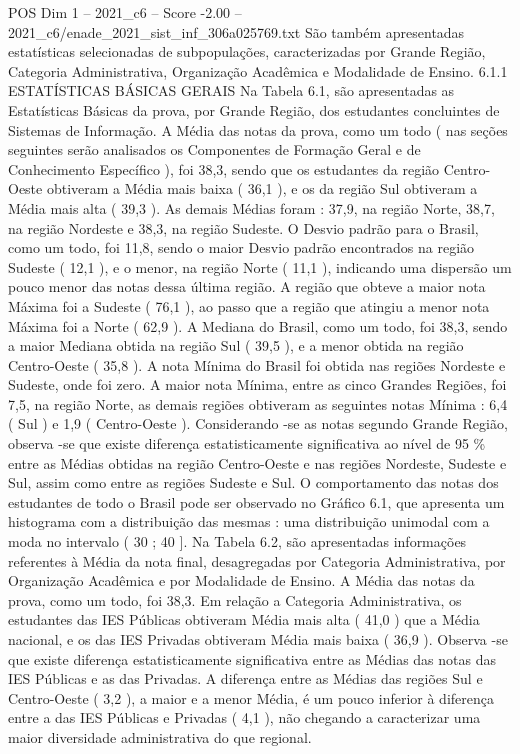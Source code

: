 \begin{textsample}{POS Dim 1 – 2021\_c6 – Score -2.00 – 2021\_c6/enade\_2021\_sist\_inf\_306a025769.txt}
São também apresentadas estatísticas selecionadas de subpopulações, caracterizadas por Grande Região, Categoria Administrativa, Organização Acadêmica e Modalidade de Ensino. 6.1.1 ESTATÍSTICAS BÁSICAS GERAIS Na Tabela 6.1, são apresentadas as Estatísticas Básicas da prova, por Grande Região, dos estudantes concluintes de Sistemas de Informação.
A Média das notas da prova, como um todo ( nas seções seguintes serão analisados os Componentes de Formação Geral e de Conhecimento Específico ), foi 38,3, sendo que os estudantes da região Centro-Oeste obtiveram a Média mais baixa ( 36,1 ), e os da região Sul obtiveram a Média mais alta ( 39,3 ).
As demais Médias foram : 37,9, na região Norte, 38,7, na região Nordeste e 38,3, na região Sudeste.
O Desvio padrão para o Brasil, como um todo, foi 11,8, sendo o maior Desvio padrão encontrados na região Sudeste ( 12,1 ), e o menor, na região Norte ( 11,1 ), indicando uma dispersão um pouco menor das notas dessa última região.
A região que obteve a maior nota Máxima foi a Sudeste ( 76,1 ), ao passo que a região que atingiu a menor nota Máxima foi a Norte ( 62,9 ).
A Mediana do Brasil, como um todo, foi 38,3, sendo a maior Mediana obtida na região Sul ( 39,5 ), e a menor obtida na região Centro-Oeste ( 35,8 ).
A nota Mínima do Brasil foi obtida nas regiões Nordeste e Sudeste, onde foi zero.
A maior nota Mínima, entre as cinco Grandes Regiões, foi 7,5, na região Norte, as demais regiões obtiveram as seguintes notas Mínima : 6,4 ( Sul ) e 1,9 ( Centro-Oeste ).
Considerando -se as notas segundo Grande Região, observa -se que existe diferença estatisticamente significativa ao nível de 95 \% entre as Médias obtidas na região Centro-Oeste e nas regiões Nordeste, Sudeste e Sul, assim como entre as regiões Sudeste e Sul.
O comportamento das notas dos estudantes de todo o Brasil pode ser observado no Gráfico 6.1, que apresenta um histograma com a distribuição das mesmas : uma distribuição unimodal com a moda no intervalo ( 30 ; 40 ].
Na Tabela 6.2, são apresentadas informações referentes à Média da nota final, desagregadas por Categoria Administrativa, por Organização Acadêmica e por Modalidade de Ensino.
A Média das notas da prova, como um todo, foi 38,3.
Em relação a Categoria Administrativa, os estudantes das IES Públicas obtiveram Média mais alta ( 41,0 ) que a Média nacional, e os das IES Privadas obtiveram Média mais baixa ( 36,9 ).
Observa -se que existe diferença estatisticamente significativa entre as Médias das notas das IES Públicas e as das Privadas.
A diferença entre as Médias das regiões Sul e Centro-Oeste ( 3,2 ), a maior e a menor Média, é um pouco inferior à diferença entre a das IES Públicas e Privadas ( 4,1 ), não chegando a caracterizar uma maior diversidade administrativa do que regional.

\end{textsample}
